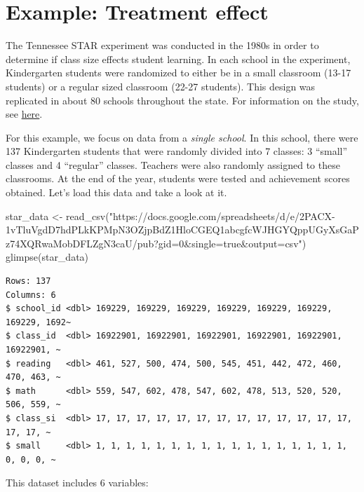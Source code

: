 \documentclass[
  letterpaper,
  DIV=11,
  numbers=noendperiod]{scrreprt}
\newenvironment{Shaded}{\begin{snugshade}}{\end{snugshade}}
\newcommand{\FunctionTok}[1]{\textcolor[rgb]{0.28,0.35,0.67}{#1}}
\newcommand{\NormalTok}[1]{\textcolor[rgb]{0.00,0.23,0.31}{#1}}
\newcommand{\OtherTok}[1]{\textcolor[rgb]{0.00,0.23,0.31}{#1}}
\newcommand{\StringTok}[1]{\textcolor[rgb]{0.13,0.47,0.30}{#1}}
\theoremstyle{definition}
\theoremstyle{remark}
\begin{document}
\hypertarget{sec-example-TE}{%
\section{Example: Treatment effect}\label{sec-example-TE}}

The Tennessee STAR experiment was conducted in the 1980s in order to
determine if class size effects student learning. In each school in the
experiment, Kindergarten students were randomized to either be in a
small classroom (13-17 students) or a regular sized classroom (22-27
students). This design was replicated in about 80 schools throughout the
state. For information on the study, see
\href{https://en.wikipedia.org/wiki/Class-size_reduction}{here}.

For this example, we focus on data from a \emph{single school}. In this
school, there were 137 Kindergarten students that were randomly divided
into 7 classes: 3 ``small'' classes and 4 ``regular'' classes. Teachers
were also randomly assigned to these classrooms. At the end of the year,
students were tested and achievement scores obtained. Let's load this
data and take a look at it.

\begin{Shaded}
\begin{Highlighting}[]
\NormalTok{star\_data }\OtherTok{\textless{}{-}} \FunctionTok{read\_csv}\NormalTok{(}\StringTok{"https://docs.google.com/spreadsheets/d/e/2PACX{-}1vTluVgdD7hdPLkKPMpN3OZjpBdZ1HloCGEQ1abcgfcWJHGYQppUGyXsGaPz74XQRwaMobDFLZgN3caU/pub?gid=0\&single=true\&output=csv"}\NormalTok{)}
\FunctionTok{glimpse}\NormalTok{(star\_data)}
\end{Highlighting}
\end{Shaded}

\begin{verbatim}
Rows: 137
Columns: 6
$ school_id <dbl> 169229, 169229, 169229, 169229, 169229, 169229, 169229, 1692~
$ class_id  <dbl> 16922901, 16922901, 16922901, 16922901, 16922901, 16922901, ~
$ reading   <dbl> 461, 527, 500, 474, 500, 545, 451, 442, 472, 460, 470, 463, ~
$ math      <dbl> 559, 547, 602, 478, 547, 602, 478, 513, 520, 520, 506, 559, ~
$ class_si  <dbl> 17, 17, 17, 17, 17, 17, 17, 17, 17, 17, 17, 17, 17, 17, 17, ~
$ small     <dbl> 1, 1, 1, 1, 1, 1, 1, 1, 1, 1, 1, 1, 1, 1, 1, 1, 1, 0, 0, 0, ~
\end{verbatim}

This dataset includes 6 variables:
\end{document}
